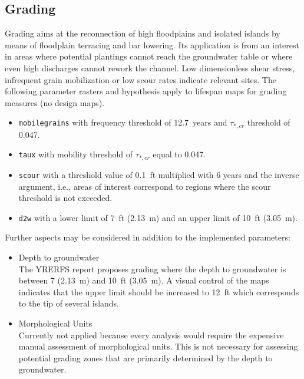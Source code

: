\subsection{Grading}\label{sec:grading}
Grading aims at the reconnection of high floodplains and isolated islands by means of floodplain terracing and bar lowering. Its application is from an interest in areas where potential plantings cannot reach the groundwater table or where even high discharges cannot rework the channel. Low dimensionless shear stress, infrequent grain mobilization or low scour rates indicate relevant sites. The following parameter rasters and hypothesis apply to lifespan maps for grading measures (no design maps).
\begin{itemize}
	\item \texttt{mobile{\myUnderscore}grains} with frequency threshold of 12.7~years and $\tau_{*,cr}$ threshold of 0.047.
	\item \texttt{taux} with mobility threshold of $\tau_{*,cr}$ equal to 0.047.
	\item \texttt{scour} with a threshold value of 0.1~ft multiplied with 6 years and the inverse argument, i.e., areas of interest correspond to regions where the scour threshold is not exceeded.
	\item \texttt{d2w} with a lower limit of 7~ft (2.13~m) and an upper limit of 10~ft (3.05~m).
\end{itemize}

Further aspects may be considered in addition to the implemented parameters:
\begin{itemize}
	\item Depth to groundwater\\
	The YRERFS report \citep{ycwa16} proposes grading where the depth to groundwater is between 7 (2.13~m) and 10~ft (3.05~m). A visual control of the maps indicates that the upper limit should be increased to 12~ft which corresponds to the tip of several islands.
	\item Morphological Units\\
	Currently not applied because every analysis would require the expensive manual assessment of morphological units. This is not necessary for assessing potential grading zones that are primarily determined by the depth to groundwater.
\end{itemize}

